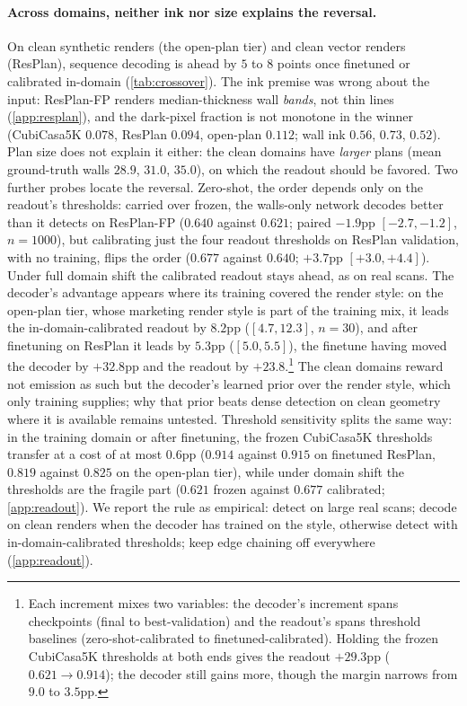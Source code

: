 \documentclass{article}
\begin{document}
\paragraph{Across domains, neither ink nor size explains the reversal.} On
clean synthetic renders (the open-plan tier) and clean vector renders
(ResPlan), sequence decoding is ahead by $5$ to $8$ points once finetuned or
calibrated in-domain (\cref{tab:crossover}). The ink premise was
wrong about the input: ResPlan-FP renders median-thickness wall \emph{bands},
not thin lines (\cref{app:resplan}), and the dark-pixel fraction is not
monotone in the winner (CubiCasa5K $0.078$, ResPlan $0.094$, open-plan $0.112$; wall
ink $0.56$, $0.73$, $0.52$). Plan size does not explain it either: the clean
domains have \emph{larger} plans (mean ground-truth walls $28.9$, $31.0$,
$35.0$), on which the readout should be favored. Two further probes locate the reversal. Zero-shot, the order
depends only on the readout's thresholds: carried over frozen, the walls-only
network decodes better than it detects on ResPlan-FP ($0.640$ against
$0.621$; paired $-1.9$pp $[-2.7,-1.2]$, $n=1000$), but calibrating just the
four readout thresholds on ResPlan validation, with no training, flips the
order ($0.677$ against $0.640$; $+3.7$pp $[+3.0,+4.4]$). Under full domain
shift the calibrated readout stays ahead, as on real scans. The
decoder's advantage appears where its training covered the render style: on
the open-plan tier, whose marketing render style is part of the training mix,
it leads the in-domain-calibrated readout by $8.2$pp ($[4.7,12.3]$, $n=30$),
and after finetuning on ResPlan it leads by $5.3$pp ($[5.0,5.5]$), the finetune having moved the decoder by $+32.8$pp and the readout by
$+23.8$.\footnote{Each increment mixes two variables: the decoder's increment spans checkpoints (final to best-validation) and the readout's spans threshold
baselines (zero-shot-calibrated to finetuned-calibrated). Holding the frozen
CubiCasa5K thresholds at both ends gives the readout $+29.3$pp ($0.621\to0.914$);
the decoder still gains more, though the margin narrows from $9.0$ to
$3.5$pp.}
The clean domains reward not emission as such but the decoder's
learned prior over the render style, which only training supplies; why that
prior beats dense detection on clean geometry where it is available remains
untested. Threshold sensitivity splits the same way: in the training domain
or after finetuning, the frozen CubiCasa5K thresholds transfer at a cost of at most
$0.6$pp ($0.914$ against $0.915$ on finetuned ResPlan, $0.819$ against
$0.825$ on the open-plan tier), while under domain shift the thresholds are
the fragile part ($0.621$ frozen against $0.677$ calibrated;
\cref{app:readout}). We report the rule as empirical: detect on large real
scans; decode on clean renders when the decoder has trained on the style,
otherwise detect with in-domain-calibrated thresholds; keep edge chaining off
everywhere (\cref{app:readout}).
\end{document}
